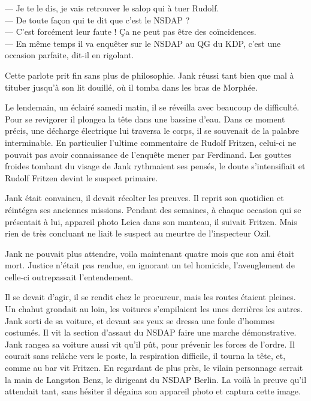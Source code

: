 --- Je te le dis, je vais retrouver le salop qui à tuer Rudolf.\\
--- De toute façon qui te dit que c'est le NSDAP ?\\
--- C'est forcément leur faute ! Ça ne peut pas être des coïncidences.\\
--- En même temps il va enquêter sur le NSDAP au QG du KDP, c'est une occasion parfaite, dit-il en rigolant.

Cette parlote prit fin sans plus de philosophie.
Jank réussi tant bien que mal à tituber jusqu'à son lit douillé, où il tomba dans les bras de Morphée.

Le lendemain, un éclairé samedi matin, il se réveilla avec beaucoup de difficulté.
Pour se revigorer il plongea la tête dans une bassine d'eau. 
Dans ce moment précis, une décharge électrique lui traversa le corps, il se souvenait de la palabre interminable.
En particulier l'ultime commentaire de Rudolf Fritzen, celui-ci ne pouvait pas avoir connaissance de l'enquête mener par Ferdinand.
Les gouttes froides tombant du visage de Jank rythmaient ses pensés, le doute s'intensifiait et Rudolf Fritzen devint le suspect primaire.

Jank était convaincu, il devait récolter les preuves. 
Il reprit son quotidien et réintégra ses anciennes missions.
Pendant des semaines, à chaque occasion qui se présentait à lui, appareil photo Leica dans son manteau, il suivait Fritzen.
Mais rien de très concluant ne liait le suspect au meurtre de l'inspecteur Ozil.

Jank ne pouvait plus attendre, voila maintenant quatre mois que son ami était mort.
Justice n'était pas rendue, en ignorant un tel homicide, l'aveuglement de celle-ci outrepassait l'entendement.

Il se devait d'agir, il se rendit chez le procureur, mais les routes étaient pleines.
Un chahut grondait au loin, les voitures s'empilaient les unes derrières les autres.
Jank sorti de sa voiture, et devant ses yeux se dressa une foule d'hommes costumés.
Il vit la section d'assaut du NSDAP faire une marche démonstrative.
Jank rangea sa voiture aussi vit qu'il pût, pour prévenir les forces de l'ordre.
Il courait sans relâche vers le poste, la respiration difficile, il tourna la tête, et, comme au bar vit Fritzen.
En regardant de plus près, le vilain personnage serrait la main de Langston Benz, le dirigeant du NSDAP Berlin.
La voilà la preuve qu'il attendait tant, sans hésiter il dégaina son appareil photo et captura cette image.

